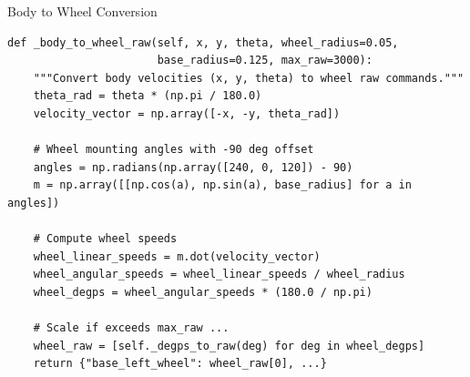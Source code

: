 \begin{frame}[fragile]{Body to Wheel Conversion}
\begin{lstlisting}[basicstyle=\ttfamily\scriptsize]
def _body_to_wheel_raw(self, x, y, theta, wheel_radius=0.05,
                       base_radius=0.125, max_raw=3000):
    """Convert body velocities (x, y, theta) to wheel raw commands."""
    theta_rad = theta * (np.pi / 180.0)
    velocity_vector = np.array([-x, -y, theta_rad])

    # Wheel mounting angles with -90 deg offset
    angles = np.radians(np.array([240, 0, 120]) - 90)
    m = np.array([[np.cos(a), np.sin(a), base_radius] for a in angles])

    # Compute wheel speeds
    wheel_linear_speeds = m.dot(velocity_vector)
    wheel_angular_speeds = wheel_linear_speeds / wheel_radius
    wheel_degps = wheel_angular_speeds * (180.0 / np.pi)

    # Scale if exceeds max_raw ...
    wheel_raw = [self._degps_to_raw(deg) for deg in wheel_degps]
    return {"base_left_wheel": wheel_raw[0], ...}
\end{lstlisting}
\end{frame}

